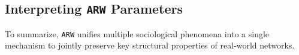 \subsection{Interpreting \texttt{ARW} Parameters}

To summarize, \texttt{ARW} unifies multiple sociological phenomena
into a single mechanism to jointly preserve key structural
properties of real-world networks.




%
%
%


